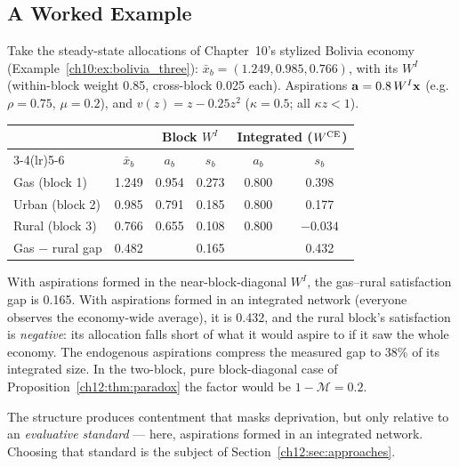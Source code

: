 \documentclass[../structural_economics_book.tex]{subfiles}
\begin{document}
\subsection{A Worked Example}

\begin{example}\label{ch12:ex:satisfaction}
Take the steady-state allocations of Chapter~10's stylized Bolivia economy (Example~\ref{ch10:ex:bolivia_three}): $\bar{x}_b = (1.249, 0.985, 0.766)$, with its $W^I$ (within-block weight 0.85, cross-block 0.025 each). Aspirations $\mathbf{a} = 0.8\,W^I\mathbf{x}$ (e.g.\ $\rho = 0.75$, $\mu = 0.2$), and $v(z) = z - 0.25z^2$ ($\kappa = 0.5$; all $\kappa z < 1$).

\begin{center}
\small
\begin{tabular}{lccccc}
\toprule
& & \multicolumn{2}{c}{Block $W^I$} & \multicolumn{2}{c}{Integrated ($W^{\text{CE}}$)} \\
\cmidrule(lr){3-4}\cmidrule(lr){5-6}
& $\bar{x}_b$ & $a_b$ & $s_b$ & $a_b$ & $s_b$ \\
\midrule
Gas (block 1) & 1.249 & 0.954 & 0.273 & 0.800 & 0.398 \\
Urban (block 2) & 0.985 & 0.791 & 0.185 & 0.800 & 0.177 \\
Rural (block 3) & 0.766 & 0.655 & 0.108 & 0.800 & $-0.034$ \\
\midrule
Gas $-$ rural gap & 0.482 & & 0.165 & & 0.432 \\
\bottomrule
\end{tabular}
\end{center}

With aspirations formed in the near-block-diagonal $W^I$, the gas--rural satisfaction gap is 0.165. With aspirations formed in an integrated network (everyone observes the economy-wide average), it is 0.432, and the rural block's satisfaction is \textit{negative}: its allocation falls short of what it would aspire to if it saw the whole economy. The endogenous aspirations compress the measured gap to 38\% of its integrated size. In the two-block, pure block-diagonal case of Proposition~\ref{ch12:thm:paradox} the factor would be $1 - \mathcal{M} = 0.2$.

The structure produces contentment that masks deprivation, but only relative to an \textit{evaluative standard} --- here, aspirations formed in an integrated network. Choosing that standard is the subject of Section~\ref{ch12:sec:approaches}.
\end{example}
\end{document}
